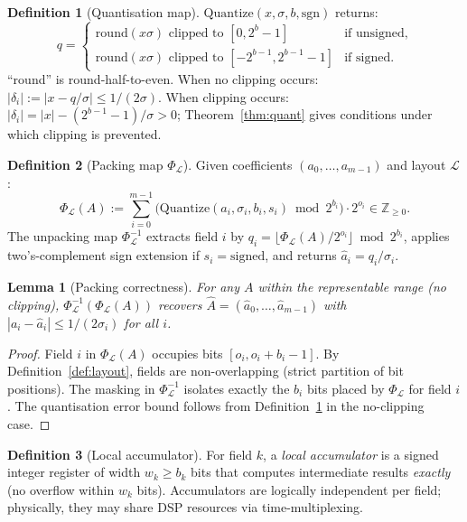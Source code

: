 \documentclass[11pt,a4paper]{article}
\theoremstyle{definition}
\newtheorem{definition}{Definition}[section]
\theoremstyle{plain}
\newtheorem{lemma}{Lemma}[section]
\theoremstyle{remark}
\newcommand{\Quantize}{\mathrm{Quantize}}
\newcommand{\Pack}{\Phi_{\mathcal{L}}}
\newcommand{\Unpack}{\Phi^{-1}_{\mathcal{L}}}
\begin{document}
\begin{definition}[Quantisation map]
\label{def:quantize}
$\Quantize(x, \sigma, b, \mathrm{sgn})$ returns:
\[
  q = \begin{cases}
    \mathrm{round}(x\sigma) \text{ clipped to } [0, 2^b-1]
      & \text{if unsigned,}\\
    \mathrm{round}(x\sigma) \text{ clipped to } [-2^{b-1}, 2^{b-1}-1]
      & \text{if signed.}
  \end{cases}
\]
``round'' is round-half-to-even.
When no clipping occurs: $|\delta_i| := |x - q/\sigma| \le 1/(2\sigma)$.
When clipping occurs: $|\delta_i| = |x| - (2^{b-1}-1)/\sigma > 0$;
Theorem~\ref{thm:quant} gives conditions under which clipping is
prevented.
\end{definition}

\begin{definition}[Packing map $\Pack$]
\label{def:pack}
Given coefficients $(a_0, \ldots, a_{m-1})$ and layout $\mathcal{L}$:
\[
  \Pack(A) := \sum_{i=0}^{m-1}
    \bigl(\Quantize(a_i, \sigma_i, b_i, s_i) \bmod 2^{b_i}\bigr)
    \cdot 2^{o_i} \in \mathbb{Z}_{\ge 0}.
\]
The unpacking map $\Unpack$ extracts field $i$ by
$q_i = \lfloor \Pack(A) / 2^{o_i} \rfloor \bmod 2^{b_i}$,
applies two's-complement sign extension if $s_i = \mathrm{signed}$,
and returns $\hat{a}_i = q_i / \sigma_i$.
\end{definition}

\begin{lemma}[Packing correctness]
\label{lem:pack}
For any $A$ within the representable range (no clipping),
$\Unpack(\Pack(A))$ recovers $\hat{A} = (\hat{a}_0, \ldots, \hat{a}_{m-1})$
with $|a_i - \hat{a}_i| \le 1/(2\sigma_i)$ for all $i$.
\end{lemma}
\begin{proof}
Field $i$ in $\Pack(A)$ occupies bits $[o_i, o_i+b_i-1]$.
By Definition~\ref{def:layout}, fields are non-overlapping (strict
partition of bit positions).
The masking in $\Unpack$ isolates exactly the $b_i$ bits placed by
$\Pack$ for field $i$.
The quantisation error bound follows from Definition~\ref{def:quantize}
in the no-clipping case.
\end{proof}

\begin{definition}[Local accumulator]
\label{def:accum}
For field $k$, a \emph{local accumulator} is a signed integer register
of width $w_k \ge b_k$ bits that computes intermediate results
\emph{exactly} (no overflow within $w_k$ bits).
Accumulators are logically independent per field; physically, they may
share DSP resources via time-multiplexing.
\end{definition}
\end{document}
